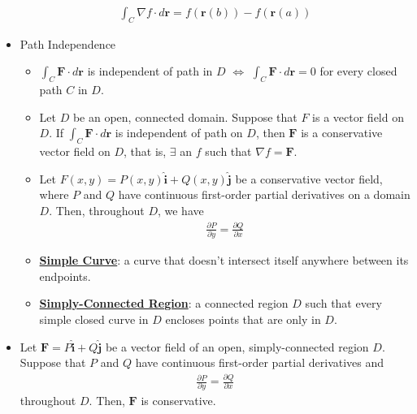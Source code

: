 \documentclass[11pt]{article}
\newcommand{\dfn}[1]{\underline{\textbf{#1}}}
\begin{document}
\begin{itemize}[noitemsep]
	\begin{align}
		\int_C \nabla f \cdot d \mathbf{r}  = f (\mathbf{r}(b)) - f (\mathbf{r}(a)) 	
	\end{align}
	\item Path Independence
	\begin{itemize}[noitemsep]
		\item $\int_C \mathbf{F} \cdot d \mathbf{r}$ is independent of path in $D$ $\iff$ $\int_C \mathbf{F} \cdot d \mathbf{r} = 0$ for every closed path $C$ in $D$.
		\item Let $D$ be an open, connected domain. Suppose that $F$ is a vector field on $D$. If $\int_C \mathbf{F} \cdot d \mathbf{r}$ is independent of path on $D$, then $\mathbf{F}$ is a conservative vector field on $D$, that is, $\exists$ an $f$ such that $\nabla f = \mathbf{F}$.
		\item Let $F(x,y) = P(x,y) \hat{\mathbf{i}} + Q(x,y) \hat{\mathbf{j}} $ be a conservative vector field, where $P $ and $Q$ have continuous first-order partial derivatives on a domain $D$. Then, throughout $D$, we have
		\begin{align}
			\frac{\partial P}{\partial y} = \frac{\partial Q}{\partial x}	
		\end{align}
		\item \dfn{Simple Curve}: a curve that doesn't intersect itself anywhere between its endpoints. 
		\item \dfn{Simply-Connected Region}: a connected region $D$ such that every simple closed curve in $D$ encloses points that are only in $D$.
	\end{itemize}
	\item Let $\mathbf{F} = P \hat{\mathbf{i}} + Q \mathbf{\hat{j}}$ be a vector field of an open, simply-connected region $D$. Suppose that $P$ and $Q$ have continuous first-order partial derivatives and 
	\begin{align}
		\frac{\partial P}{\partial y} = \frac{\partial Q}{\partial x}	
	\end{align}
	throughout $D$. Then, $\mathbf{F}$ is conservative. 
\end{itemize}
\end{document}
